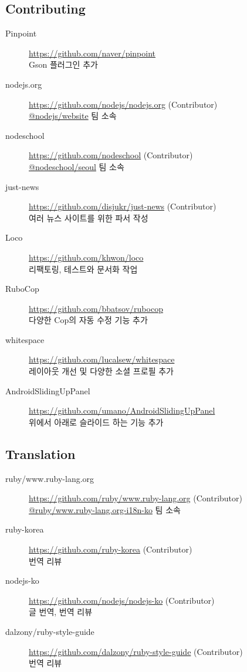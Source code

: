 \documentclass[a4paper,10pt]{article}
\begin{document}
\subsection{Contributing}
\begin{description}
  \item[Pinpoint] \url{https://github.com/naver/pinpoint} \\
    Gson 플러그인 추가
  \item[nodejs.org] \url{https://github.com/nodejs/nodejs.org} (Contributor) \\
    \href{https://github.com/orgs/nodejs/teams/website}{@nodejs/website} 팀 소속
  \item[nodeschool] \url{https://github.com/nodeschool} (Contributor) \\
    \href{https://github.com/orgs/nodeschool/teams/seoul}{@nodeschool/seoul} 팀 소속
  \item[just-news] \url{https://github.com/disjukr/just-news} (Contributor) \\
    여러 뉴스 사이트를 위한 파서 작성
  \item[Loco] \url{https://github.com/khwon/loco} \\
    리팩토링, 테스트와 문서화 작업
  \item[RuboCop] \url{https://github.com/bbatsov/rubocop} \\
    다양한 Cop의 자동 수정 기능 추가
  \item[whitespace] \url{https://github.com/lucalsew/whitespace} \\
    레이아웃 개선 및 다양한 소셜 프로필 추가
  \item[AndroidSlidingUpPanel] \url{https://github.com/umano/AndroidSlidingUpPanel} \\
    위에서 아래로 슬라이드 하는 기능 추가
\end{description}

\subsection{Translation}
\begin{description}
  \item[ruby/www.ruby-lang.org] \url{https://github.com/ruby/www.ruby-lang.org} (Contributor) \\
    \href{https://github.com/orgs/ruby/teams/www-ruby-lang-org-i18n-ko}{@ruby/www.ruby-lang.org-i18n-ko} 팀 소속
  \item[ruby-korea] \url{https://github.com/ruby-korea} (Contributor) \\
    번역 리뷰
  \item[nodejs-ko] \url{https://github.com/nodejs/nodejs-ko} (Contributor) \\
    글 번역, 번역 리뷰
  \item[dalzony/ruby-style-guide] \url{https://github.com/dalzony/ruby-style-guide} (Contributor) \\
    번역 리뷰
\end{description}


\end{document}
